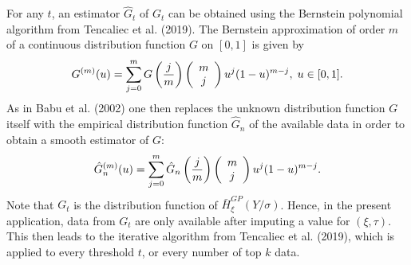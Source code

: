 \documentclass[twoside,leqno,11pt]{article}
\begin{document}
\noindent
For any $t$, an estimator $\hat{G}_{t}$ of $G_{t}$ can be obtained 
using the Bernstein polynomial  algorithm from Tencaliec et al. (2019). 
The Bernstein approximation of order $m$ of a continuous distribution function $G$ on $[0,1]$
is given by 
\[
G^{(m)}(u) = \sum_{j=0}^m G\left( {j \over m}\right)\left( \begin{array}{c} m \\ j \end{array}\right)u^j (1-u)^{m-j},
\; u \in [0,1].
\]
As in Babu et al. (2002) one then replaces the unknown distribution function $G$ itself with the empirical distribution function $\hat{G}_n$ of the available data in order to obtain a smooth estimator of $G$:
\[
\hat{G}_n^{(m)}(u) = \sum_{j=0}^m \hat{G}_n\left( {j \over m}\right)\left( \begin{array}{c} m \\ j \end{array}\right)u^j (1-u)^{m-j}. 
\] 
Note that $G_t$ is the distribution function of
 $\bar{H}_{\xi}^{GP}(Y/\sigma)$. Hence, in the present application, data from $G_t$ are only available after imputing a value for $(\xi,\tau)$. This then leads to the iterative algorithm from Tencaliec et al. (2019), which is applied to every threshold $t$, or every number of top $k$ data.
\end{document}
